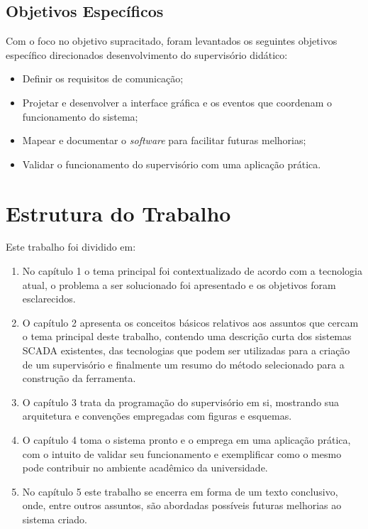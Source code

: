 \subsection{Objetivos Específicos}

Com o foco no objetivo supracitado, foram levantados os seguintes objetivos específico direcionados desenvolvimento do supervisório didático:

\begin{itemize}
	\item Definir os requisitos de comunicação;
	\item Projetar e desenvolver a interface gráfica e os eventos que coordenam o funcionamento do sistema;
	\item Mapear e documentar o \textit{software} para facilitar futuras melhorias;
	\item Validar o funcionamento do supervisório com uma aplicação prática.
\end{itemize}

\section{Estrutura do Trabalho}

Este trabalho foi dividido em:

\begin{enumerate}
	\item No capítulo 1 o tema principal foi contextualizado de acordo com a tecnologia atual, o problema a ser solucionado foi apresentado e os objetivos foram esclarecidos.
	\item O capítulo 2 apresenta os conceitos básicos relativos aos assuntos que cercam o tema principal deste trabalho, contendo uma descrição curta dos sistemas SCADA existentes, das tecnologias que podem ser utilizadas para a criação de um supervisório e finalmente um resumo do método selecionado para a construção da ferramenta.
	\item O capítulo 3 trata da programação do supervisório em si, mostrando sua arquitetura e convenções empregadas com figuras e esquemas.
	\item O capítulo 4 toma o sistema pronto e o emprega em uma aplicação prática, com o intuito de validar seu funcionamento e exemplificar como o mesmo pode contribuir no ambiente acadêmico da universidade.
	\item No capítulo 5 este trabalho se encerra em forma de um texto conclusivo, onde, entre outros assuntos, são abordadas possíveis futuras melhorias ao sistema criado.
\end{enumerate}